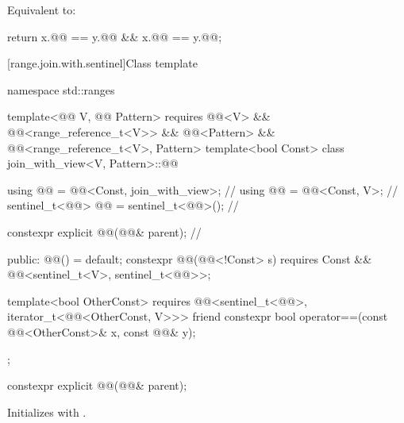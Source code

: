 \begin{itemdescr}
\pnum
\effects
Equivalent to:
\begin{codeblock}
return x.@@ == y.@@ && x.@@ == y.@@;
\end{codeblock}
\end{itemdescr}

[range.join.with.sentinel]{Class template }

%
\begin{codeblock}
namespace std::ranges {
  template<@@ V, @@ Pattern>
    requires @@<V> && @@<range_reference_t<V>>
          && @@<Pattern> && @@<range_reference_t<V>, Pattern>
  template<bool Const>
  class join_with_view<V, Pattern>::@@ {
    using @@ = @@<Const, join_with_view>;  // \expos
    using @@ = @@<Const, V>;                 // \expos
    sentinel_t<@@> @@ = sentinel_t<@@>();         // \expos

    constexpr explicit @@(@@& parent);        // \expos

  public:
    @@() = default;
    constexpr @@(@@<!Const> s)
      requires Const && @@<sentinel_t<V>, sentinel_t<@@>>;

    template<bool OtherConst>
      requires @@<sentinel_t<@@>, iterator_t<@@<OtherConst, V>>>
    friend constexpr bool operator==(const @@<OtherConst>& x, const @@& y);
  };
}
\end{codeblock}

%
\begin{itemdecl}
constexpr explicit @@(@@& parent);
\end{itemdecl}

\begin{itemdescr}
\pnum
\effects
Initializes  with .
\end{itemdescr}

